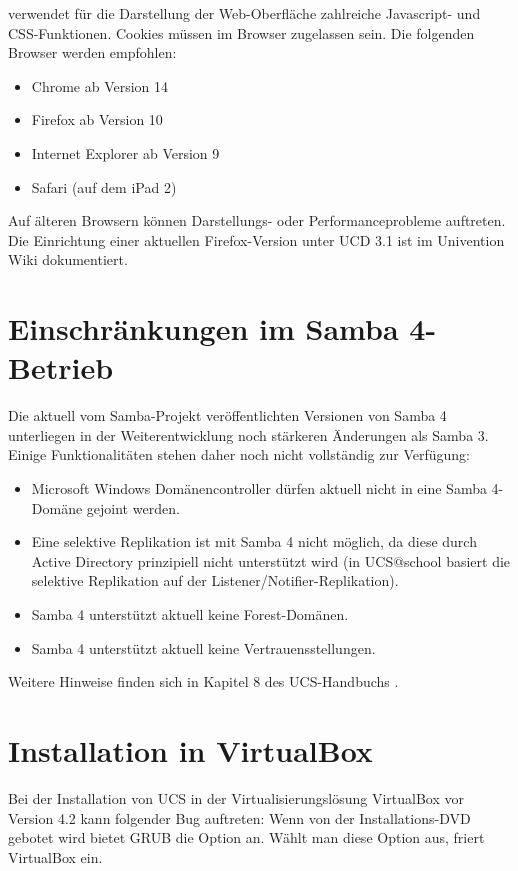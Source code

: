 \ucsUMC{} verwendet für die Darstellung der Web-Oberfläche zahlreiche
Javascript- und CSS-Funktionen. Cookies müssen im Browser zugelassen
sein. Die folgenden Browser werden empfohlen:

\begin{itemize}
\item Chrome ab Version 14
\item Firefox ab Version 10
\item Internet Explorer ab Version 9
\item Safari (auf dem iPad 2)
\end{itemize}

Auf älteren Browsern können Darstellungs- oder Performanceprobleme
auftreten. Die Einrichtung einer aktuellen Firefox-Version unter UCD
3.1 ist im Univention Wiki \cite{ucd-firefox7} dokumentiert.

\section{Einschränkungen im Samba 4-Betrieb}

Die aktuell vom Samba-Projekt veröffentlichten Versionen von Samba 4
unterliegen in der Weiterentwicklung noch stärkeren Änderungen als Samba
3. Einige Funktionalitäten stehen daher noch nicht vollständig zur Verfügung:

\begin{itemize}
\item Microsoft Windows Domänencontroller dürfen aktuell nicht in eine Samba 4-Domäne
gejoint werden.
\item Eine selektive Replikation ist mit Samba 4 nicht möglich, da diese durch
Active Directory prinzipiell nicht unterstützt wird (in UCS@school
basiert die selektive Replikation auf der Listener/Notifier-Replikation).
\item Samba 4 unterstützt aktuell keine Forest-Domänen. 
\item Samba 4 unterstützt aktuell keine Vertrauensstellungen.
\end{itemize}

Weitere Hinweise finden sich in Kapitel 8 des UCS-Handbuchs \cite{UCS-Handbuch}.

\section{Installation in VirtualBox}
Bei der Installation von UCS in der Virtualisierungslösung VirtualBox vor Version 4.2 kann folgender Bug auftreten:
Wenn von der Installations-DVD gebotet wird bietet
GRUB die Option  an. Wählt man diese Option aus, friert VirtualBox ein.

